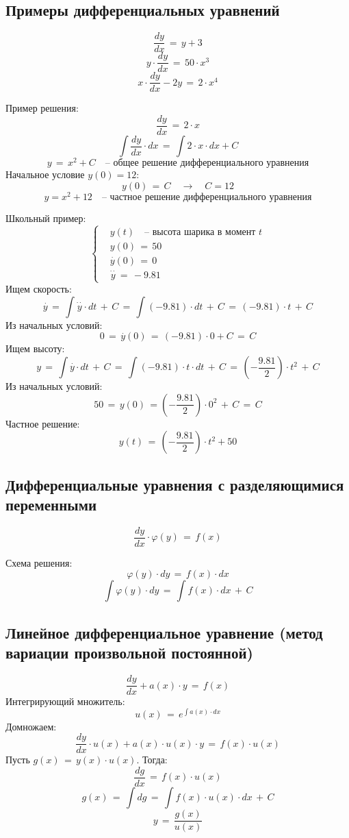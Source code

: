 \documentclass{article}
\begin{document}
\subsection*{Примеры дифференциальных уравнений}
\[ \dfrac{dy}{dx} \, = \, y \! + \! 3 \]
\[ y \! \cdot \! \dfrac{dy}{dx} \, = \, 50 \! \cdot \! x^3 \]
\[ x \! \cdot \! \dfrac{dy}{dx} \! - \! 2y \, = \, 2 \! \cdot \! x^4 \]\par
Пример решения:
\[ \dfrac{dy}{dx} \, = \, 2 \! \cdot \! x \]
\[ \int \dfrac{dy}{dx} \! \cdot \! dx \, = \, \int 2 \! \cdot \! x \! \cdot \! dx \! + \! C \]
\[ y \, = \, x^2 \! + \! C \quad \text{-- общее решение дифференциального уравнения} \]
Начальное условие $ y(0) \! = \! 12 $:
\[ y(0) \, = \, C \quad \rightarrow \quad C \! = \! 12 \]
\[ y \! = \! x^2 \! + \! 12 \quad \text{-- частное решение дифференциального уравнения} \]\par
Школьный пример:
\begin{equation*}
\left\{
\begin{aligned}
& y(t) \quad \text{-- высота шарика в момент } t \\
& y(0) \, = \, 50 \\
& \overset{\cdot}{y}(0) \, = \, 0 \\
& \overset{\cdot \cdot}{y} \, = \, -9.81
\end{aligned}
\right.
\end{equation*}
Ищем скорость:
\[ \overset{\cdot}{y} \, = \, \int \overset{\cdot \cdot}{y} \! \cdot \! dt \, + \, C \, = \, \int (-9.81) \! \cdot \! dt \, + \, C \, = \, (-9.81) \! \cdot \! t \, + \, C \]
Из начальных условий:
\[ 0 \, = \, \overset{\cdot}{y}(0) \, = \, (-9.81) \! \cdot \! 0 \! + \! C \, = \, C \]
Ищем высоту:
\[ y \, = \, \int \overset{\cdot}{y} \! \cdot \! dt \, + \, C \, = \, \int (-9.81) \! \cdot \! t \! \cdot \! dt \, + \, C \, = \, \left( -\dfrac{9.81}{2} \right) \! \cdot \! t^2 \, + \, C \]
Из начальных условий:
\[ 50 \, = \, y(0) \, = \left( -\dfrac{9.81}{2} \right) \! \cdot \! 0^2 \, + \, C \, = \, C \]
Частное решение:
\[ y(t) \, = \, \left( -\dfrac{9.81}{2} \right) \! \cdot \! t^2 \! + \! 50 \]
\subsection*{Дифференциальные уравнения с разделяющимися переменными}
\[ \dfrac{dy}{dx} \! \cdot \! \varphi (y) \, = \, f(x) \]\par
Схема решения:
\[ \varphi(y) \! \cdot \! dy \, = \, f(x) \! \cdot \! dx \]
\[ \int \varphi (y) \! \cdot \! dy \, = \, \int f(x) \! \cdot \! dx \, + \, C \]
\subsection*{Линейное дифференциальное уравнение (метод вариации произвольной постоянной)}
\[ \dfrac{dy}{dx} \! + \! a(x) \! \cdot \! y \, = \, f(x) \]
Интегрирующий множитель:
\[ u(x) \, = \, e^{\int a(x) \cdot dx} \]
Домножаем:
\[ \dfrac{dy}{dx} \! \cdot \! u(x) \! + \! a(x) \! \cdot \! u(x) \! \cdot \! y \, = \, f(x) \! \cdot \! u(x) \]
Пусть $ g(x) \, = \, y(x) \! \cdot \! u(x) $. Тогда:
\[ \dfrac{dg}{dx} \, = \, f(x) \! \cdot \! u(x) \]
\[ g(x) \, = \, \int dg \, = \, \int f(x) \! \cdot \! u(x) \! \cdot \! dx \, + \, C \]
\[ y \, = \, \dfrac{g(x)}{u(x)} \]
\end{document}
